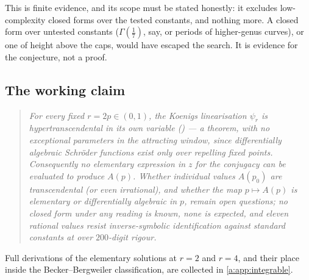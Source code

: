This is finite evidence, and its scope must be stated honestly: it excludes low-complexity closed forms over the tested constants, and nothing more. A closed form over untested constants ($\Gamma(\tfrac17)$, say, or periods of higher-genus curves), or one of height above the caps, would have escaped the search. It is evidence for the conjecture, not a proof.

\subsection{The working claim}

\begin{quote}
\textit{For every fixed $r=2p\in(0,1)$, the Koenigs linearisation $\psi_r$ is hypertranscendental in its own variable () --- a theorem, with no exceptional parameters in the attracting window, since differentially algebraic Schr\"oder functions exist only over repelling fixed points. Consequently no elementary expression in $z$ for the conjugacy can be evaluated to produce $A(p)$. Whether individual values $A(p_0)$ are transcendental (or even irrational), and whether the map $p\mapsto A(p)$ is elementary or differentially algebraic in $p$, remain open questions; no closed form under any reading is known, none is expected, and eleven rational values resist inverse-symbolic identification against standard constants at over $200$-digit rigour.}
\end{quote}

Full derivations of the elementary solutions at $r=2$ and $r=4$, and their place inside the Becker--Bergweiler classification, are collected in \cref{a:app:integrable}.

